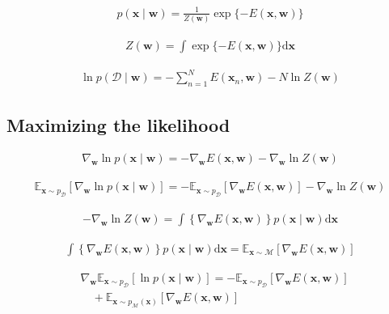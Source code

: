 \documentclass{article}
\begin{document}
\begin{align*}
p(\mathbf{x} \mid \mathbf{w})=\frac{1}{Z(\mathbf{w})} \exp \{-E(\mathbf{x}, \mathbf{w})\} \tag{14.50}
\end{align*}

\begin{align*}
Z(\mathbf{w})=\int \exp \{-E(\mathbf{x}, \mathbf{w})\} \mathrm{d} \mathbf{x} \tag{14.51}
\end{align*}

\begin{align*}
\ln p(\mathcal{D} \mid \mathbf{w})=-\sum_{n=1}^{N} E\left(\mathbf{x}_{n}, \mathbf{w}\right)-N \ln Z(\mathbf{w}) \tag{14.52}
\end{align*}

\subsection{Maximizing the likelihood}

\begin{align*}
\nabla_{\mathbf{w}} \ln p(\mathbf{x} \mid \mathbf{w})=-\nabla_{\mathbf{w}} E(\mathbf{x}, \mathbf{w})-\nabla_{\mathbf{w}} \ln Z(\mathbf{w})
\tag{14.53}
\end{align*}

\begin{align*}
\mathbb{E}_{\mathbf{x} \sim p_{\mathcal{D}}}\left[
\nabla_{\mathbf{w}} \ln p(\mathbf{x} \mid \mathbf{w})\right]
=-\mathbb{E}_{\mathbf{x} \sim p_{\mathcal{D}}}\left[
\nabla_{\mathbf{w}} E(\mathbf{x}, \mathbf{w})\right]
-\nabla_{\mathbf{w}} \ln Z(\mathbf{w}) \tag{14.54}
\end{align*}

\begin{align*}
-\nabla_{\mathbf{w}} \ln Z(\mathbf{w})=\int\left\{\nabla_{\mathbf{w}} E(\mathbf{x}, \mathbf{w})\right\} p(\mathbf{x} \mid \mathbf{w}) \mathrm{d} \mathbf{x} \tag{14.55}
\end{align*}

\begin{align*}
\int\left\{\nabla_{\mathbf{w}} E(\mathbf{x}, \mathbf{w})\right\} p(\mathbf{x} \mid \mathbf{w}) \mathrm{d} \mathbf{x}=\mathbb{E}_{\mathbf{x} \sim \mathcal{M}}\left[
\nabla_{\mathbf{w}} E(\mathbf{x}, \mathbf{w})\right]
\tag{14.56}
\end{align*}

\begin{align*}
& \nabla_{\mathbf{w}} \mathbb{E}_{\mathbf{x} \sim p_{\mathcal{D}}}[
\ln p(\mathbf{x} \mid \mathbf{w})]
=-\mathbb{E}_{\mathbf{x} \sim p_{\mathcal{D}}}\left[
\nabla_{\mathbf{w}} E(\mathbf{x}, \mathbf{w})\right]
\\
& \quad+\mathbb{E}_{\mathbf{x} \sim p_{\mathcal{M}}(\mathbf{x})}\left[
\nabla_{\mathbf{w}} E(\mathbf{x}, \mathbf{w})\right]
\tag{14.57}
\end{align*}
\end{document}
